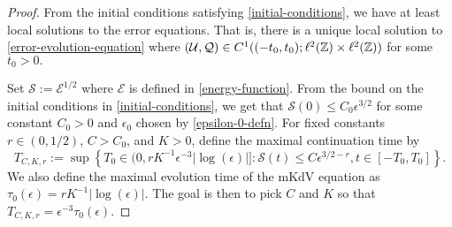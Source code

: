\begin{proof}
	From the initial conditions satisfying \cref{initial-conditions}, we have at least local solutions to the error equations. That is, there is a unique local solution to \cref{error-evolution-equation} where \((\mathcal U, \mathcal Q) \in C^1((-t_0,t_0);\ell^2(\mathbb{Z}) \times \ell^2(\mathbb{Z}))\) for some \(t_0 > 0.\)
	
	Set \(\mathcal S := \mathcal E ^{1/2}\) where \(\mathcal E\) is defined in \cref{energy-function}. From the bound on the initial conditions in \cref{initial-conditions}, we get that \(\mathcal S(0) \leq C_0 \epsilon^{3/2}\) for some constant \(C_0 > 0\) and \(\epsilon_0\) chosen by \cref{epsilon-0-defn}. For fixed constants \(r\in(0,1/2)\), \(C> C_0\), and \(K > 0\), define the maximal continuation time by 
	\begin{equation}
		T_{C,K,r} := \sup \left\{T_0 \in (0, r K^{-1} \epsilon^{-3} |\log(\epsilon)|]: \mathcal S(t) \leq C \epsilon^{3/2 -r}, t\in [-T_0, T_0]\right\}.
	\end{equation} 
	We also define the maximal evolution time of the mKdV equation as \(\tau_0(\epsilon) = rK^{-1}|\log(\epsilon)|\). The goal is then to pick \(C\) and \(K\) so that \(T_{C,K,r} = \epsilon^{-3} \tau_0(\epsilon)\).
	

\end{proof}
